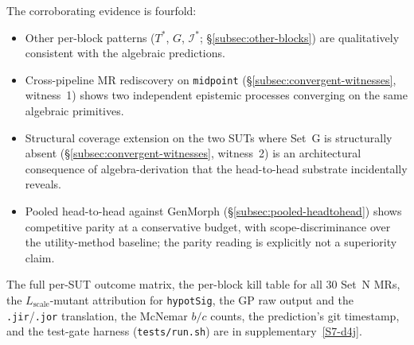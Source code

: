 The corroborating evidence is fourfold:
\begin{itemize}[nosep,leftmargin=*]
  \item Other per-block patterns ($T^{*}$, $G$, $\mathcal{I}^{*}$;
        \S\ref{subsec:other-blocks}) are qualitatively consistent
        with the algebraic predictions.
  \item Cross-pipeline MR rediscovery on \texttt{midpoint}
        (\S\ref{subsec:convergent-witnesses}, witness~1) shows two
        independent epistemic processes converging on the same
        algebraic primitives.
  \item Structural coverage extension on the two SUTs where Set~G
        is structurally absent (\S\ref{subsec:convergent-witnesses},
        witness~2) is an architectural consequence of
        algebra-derivation that the head-to-head substrate
        incidentally reveals.
  \item Pooled head-to-head against GenMorph
        (\S\ref{subsec:pooled-headtohead}) shows competitive parity
        at a conservative budget, with scope-discriminance over
        the utility-method baseline; the parity reading is
        explicitly not a superiority claim.
\end{itemize}

The full per-SUT outcome matrix, the per-block kill table for all 30
Set~N MRs, the $L_{\mathrm{scale}}$-mutant attribution for
\texttt{hypotSig}, the GP raw output and the
\texttt{.jir}/\texttt{.jor} translation, the McNemar $b/c$ counts,
the prediction's git timestamp, and the test-gate harness
(\texttt{tests/run.sh}) are in supplementary~\ref{S7-d4j}.
